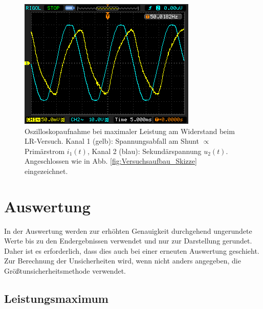 \documentclass[12pt,a4paper,twoside]{article}
\theoremstyle{definition}
\begin{document}
\begin{figure}[H]
    \centering
    \includegraphics[width=\linewidth/2]{oszi}
    \caption{Oszilloskopaufnahme bei maximaler Leistung am Widerstand beim LR-Versuch. Kanal 1 (gelb): Spannungsabfall am Shunt $\propto$ Primärstrom $i_1(t)$, Kanal 2 (blau): Sekundärspannung $u_2(t)$. Angeschlossen wie in Abb. \ref{fig:Versuchsaufbau_Skizze} eingezeichnet.}
    \label{fig:oszi}
\end{figure}



\section{Auswertung}
\label{sec:auswertung}

In der Auswertung werden zur erhöhten Genauigkeit durchgehend ungerundete Werte bis zu den Endergebnissen verwendet und nur zur Darstellung gerundet. Daher ist es erforderlich, dass dies auch bei einer erneuten Auswertung geschieht. \\
Zur Berechnung der Unsicherheiten wird, wenn nicht anders angegeben, die Größtunsicherheitsmethode verwendet.


\subsection{Leistungsmaximum}
\end{document}
